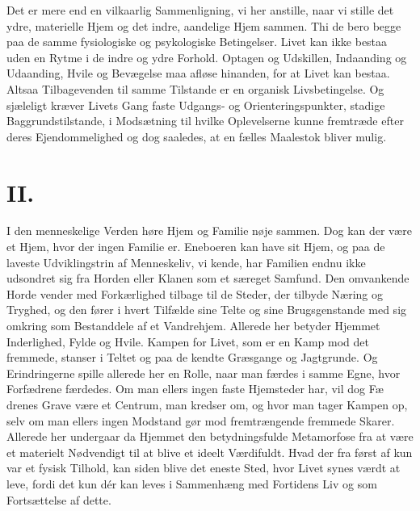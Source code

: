 \documentclass[12pt,a4paper]{article}
\newcommand{\opage}[1]{\marginnote{\footnotesize\textit{[#1]}}}
\begin{document}
Det er mere end en vilkaarlig Sammenligning, vi her anstille, naar vi stille
det ydre, materielle Hjem og det indre, aandelige Hjem sammen. Thi de bero
begge paa de samme fysiologiske og psykologiske Betingelser. Livet kan ikke
bestaa uden en Rytme i de indre og ydre Forhold. Optagen og Udskillen,
Indaanding og Udaanding, Hvile og Bevægelse maa afløse hinanden, for at Livet
kan bestaa. Altsaa Tilbagevenden til samme Tilstande er en organisk
Livsbetingelse. Og sjæleligt kræver Livets Gang faste Udgangs- og
Orienteringspunkter, stadige Baggrundstilstande, i Modsætning til hvilke
Oplevelserne kunne fremtræde efter deres Ejendommelig\-hed og dog saaledes, at en
fælles Maalestok bliver mulig.

\section*{II.}

\noindent I den menneskelige Verden høre Hjem og Familie nøje sammen.
Dog kan der være et Hjem, hvor der ingen Familie er. Eneboeren kan have sit
Hjem, og paa de laveste Udviklingstrin af Menneskeliv, vi kende, har Familien
endnu ikke udsondret sig fra Horden eller Klanen som et særeget Samfund. Den
omvankende Horde vender med Forkærlighed tilbage til de Steder, der tilbyde
Næring og Tryghed, og den fører i hvert Tilfælde sine Telte og sine
Brugsgenstande med sig omkring som Bestanddele af et Vandrehjem. Allerede her
betyder Hjemmet Inderlighed, Fylde og Hvile. Kampen for Livet, som er en Kamp
mod det fremmede, stanser i Teltet og paa de kendte Græsgange og Jagtgrunde.
Og Erindringerne spille allerede her en Rolle, naar man færdes i samme Egne,
hvor Forfædrene færdedes. Om man ellers ingen faste Hjemsteder har, vil dog
Fæ%
\opage{5}drenes Grave være et Centrum, man kredser om, og hvor man tager Kampen op,
selv om man ellers ingen Modstand gør mod fremtrængende fremmede Skarer.
Allerede her undergaar da Hjemmet den betydningsfulde Metamorfose fra at være
et materielt Nødvendigt til at blive et ideelt Værdifuldt. Hvad der fra først
af kun var et fysisk Tilhold, kan siden blive det eneste Sted, hvor Livet
synes værdt at leve, fordi det kun dér kan leves i Sammenhæng med Fortidens Liv
og som Fortsættelse af dette.
\end{document}
